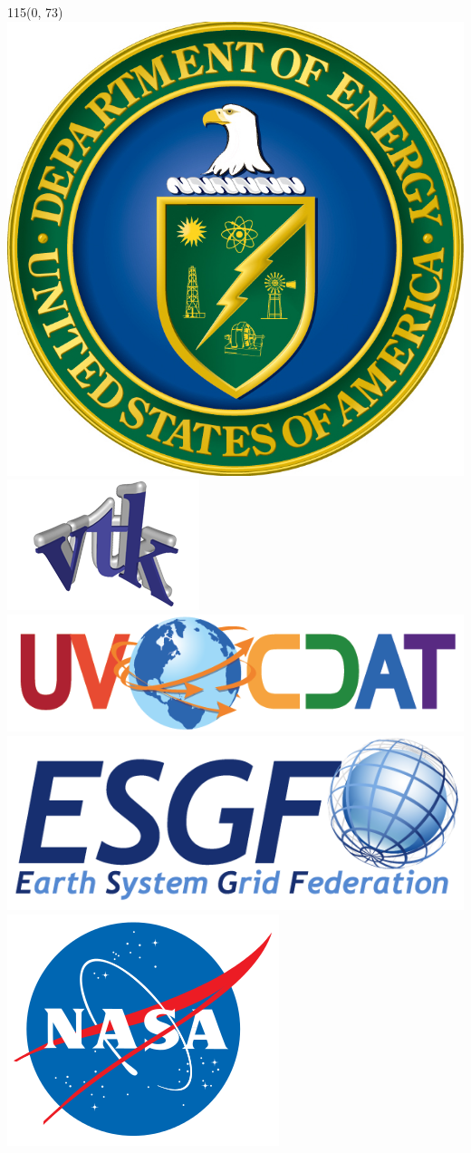 \documentclass[a0,landscape]{a0poster}
\begin{document}
\begin{textblock}{115}(0, 73)
\includegraphics[height=0.04\hsize]{images/doe-logo}
\hspace{0.3cm}
\includegraphics[height=0.04\hsize]{images/VTK_logo}
\hspace{0.3cm}
\includegraphics[height=0.04\hsize]{images/UV-CDAT_logo}
\hspace{0.3cm}
\includegraphics[height=0.04\hsize]{images/esgf_1}
\hspace{0.3cm}
\includegraphics[height=0.04\hsize]{images/nasa}
\hspace{0.3cm}
\end{textblock}
\end{document}
